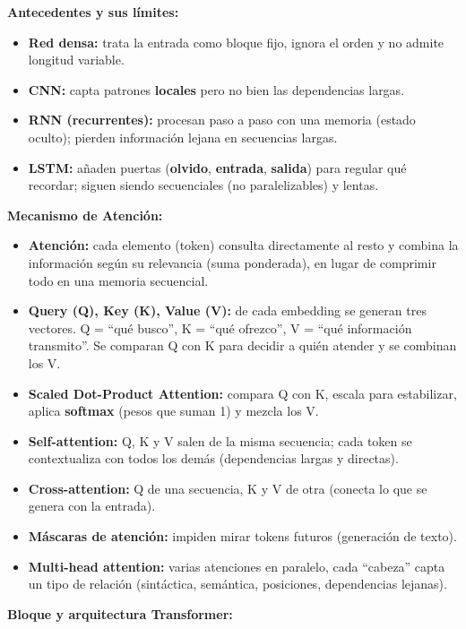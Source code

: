 \documentclass[12pt]{book} %
\providecommand{\tightlist}{%
  \setlength{\itemsep}{0pt}\setlength{\parskip}{0pt}}
\begin{document}
\textbf{Antecedentes y sus límites:}

\begin{itemize}
\tightlist
\item
  \textbf{Red densa:} trata la entrada como bloque fijo, ignora el orden
  y no admite longitud variable.
\item
  \textbf{CNN:} capta patrones \textbf{locales} pero no bien las
  dependencias largas.
\item
  \textbf{RNN (recurrentes):} procesan paso a paso con una memoria
  (estado oculto); pierden información lejana en secuencias largas.
\item
  \textbf{LSTM:} añaden puertas (\textbf{olvido}, \textbf{entrada},
  \textbf{salida}) para regular qué recordar; siguen siendo secuenciales
  (no paralelizables) y lentas.
\end{itemize}

\textbf{Mecanismo de Atención:}

\begin{itemize}
\tightlist
\item
  \textbf{Atención:} cada elemento (token) consulta directamente al
  resto y combina la información según su relevancia (suma ponderada),
  en lugar de comprimir todo en una memoria secuencial.
\item
  \textbf{Query (Q), Key (K), Value (V):} de cada embedding se generan
  tres vectores. Q = ``qué busco'', K = ``qué ofrezco'', V = ``qué
  información transmito''. Se comparan Q con K para decidir a quién
  atender y se combinan los V.
\item
  \textbf{Scaled Dot-Product Attention:} compara Q con K, escala para
  estabilizar, aplica \textbf{softmax} (pesos que suman 1) y mezcla los
  V.
\item
  \textbf{Self-attention:} Q, K y V salen de la misma secuencia; cada
  token se contextualiza con todos los demás (dependencias largas y
  directas).
\item
  \textbf{Cross-attention:} Q de una secuencia, K y V de otra (conecta
  lo que se genera con la entrada).
\item
  \textbf{Máscaras de atención:} impiden mirar tokens futuros
  (generación de texto).
\item
  \textbf{Multi-head attention:} varias atenciones en paralelo, cada
  ``cabeza'' capta un tipo de relación (sintáctica, semántica,
  posiciones, dependencias lejanas).
\end{itemize}

\textbf{Bloque y arquitectura Transformer:}
\end{document}
